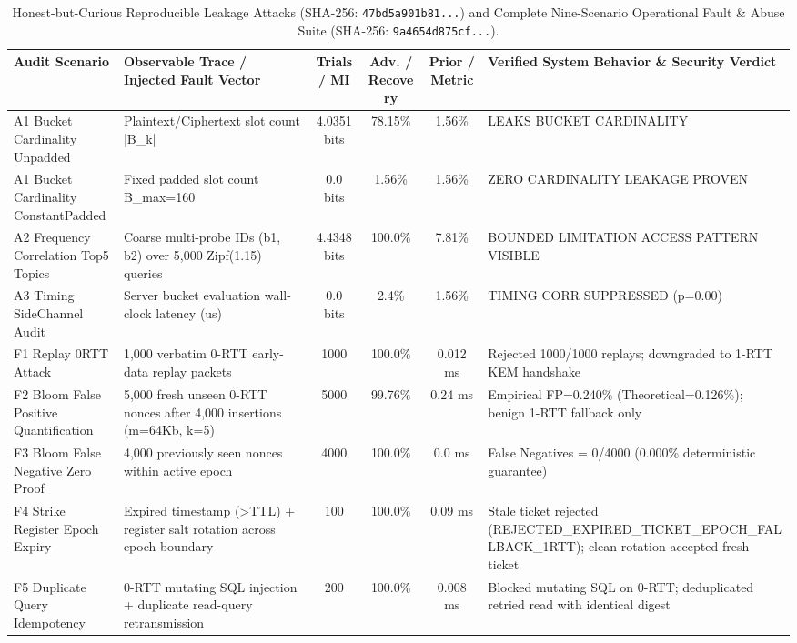 \documentclass[10pt,journal,compsoc]{IEEEtran}
\begin{document}
\begin{table}[!htbp]\centering\scriptsize
\caption{Honest-but-Curious Reproducible Leakage Attacks (SHA-256: \texttt{47bd5a901b81...}) and Complete Nine-Scenario Operational Fault \& Abuse Suite (SHA-256: \texttt{9a4654d875cf...}).}
\setlength{\tabcolsep}{3.6pt}\begin{tabular}{@{}llcccl@{}}\toprule
\textbf{Audit Scenario} & \textbf{Observable Trace / Injected Fault Vector} & \textbf{Trials / MI} & \textbf{Adv. / Recovery} & \textbf{Prior / Metric} & \textbf{Verified System Behavior \& Security Verdict} \\\midrule
A1 Bucket Cardinality Unpadded & Plaintext/Ciphertext slot count |B\_k| & 4.0351 bits & 78.15\% & 1.56\% & LEAKS BUCKET CARDINALITY \\
A1 Bucket Cardinality ConstantPadded & Fixed padded slot count B\_max=160 & 0.0 bits & 1.56\% & 1.56\% & ZERO CARDINALITY LEAKAGE PROVEN \\
A2 Frequency Correlation Top5 Topics & Coarse multi-probe IDs (b1, b2) over 5,000 Zipf(1.15) queries & 4.4348 bits & 100.0\% & 7.81\% & BOUNDED LIMITATION ACCESS PATTERN VISIBLE \\
A3 Timing SideChannel Audit & Server bucket evaluation wall-clock latency (us) & 0.0 bits & 2.4\% & 1.56\% & TIMING CORR SUPPRESSED (p=0.00) \\
\midrule
F1 Replay 0RTT Attack & 1,000 verbatim 0-RTT early-data replay packets & 1000 & 100.0\% & 0.012 ms & Rejected 1000/1000 replays; downgraded to 1-RTT KEM handshake \\
F2 Bloom False Positive Quantification & 5,000 fresh unseen 0-RTT nonces after 4,000 insertions (m=64Kb, k=5) & 5000 & 99.76\% & 0.24 ms & Empirical FP=0.240\% (Theoretical=0.126\%); benign 1-RTT fallback only \\
F3 Bloom False Negative Zero Proof & 4,000 previously seen nonces within active epoch & 4000 & 100.0\% & 0.0 ms & False Negatives = 0/4000 (0.000\% deterministic guarantee) \\
F4 Strike Register Epoch Expiry & Expired timestamp (>TTL) + register salt rotation across epoch boundary & 100 & 100.0\% & 0.09 ms & Stale ticket rejected (REJECTED\_EXPIRED\_TICKET\_EPOCH\_FALLBACK\_1RTT); clean rotation accepted fresh ticket \\
F5 Duplicate Query Idempotency & 0-RTT mutating SQL injection + duplicate read-query retransmission & 200 & 100.0\% & 0.008 ms & Blocked mutating SQL on 0-RTT; deduplicated retried read with identical digest \\

\end{tabular}
\end{table}
\end{document}
